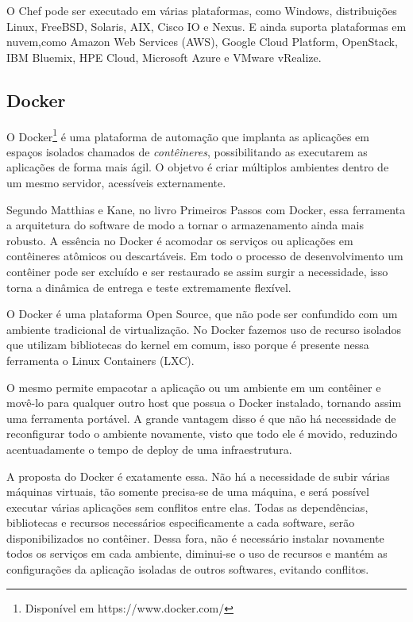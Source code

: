 O Chef pode ser executado em várias plataformas, como Windows, distribuições Linux, FreeBSD, Solaris, AIX, Cisco IO e Nexus. E ainda suporta plataformas em nuvem,como Amazon Web Services (AWS), Google Cloud Platform, OpenStack, IBM Bluemix, HPE Cloud, Microsoft Azure e VMware vRealize.

\subsection{Docker}

O Docker\footnote{Disponível em https://www.docker.com/} é uma plataforma de automação que implanta as aplicações em espaços isolados chamados de \textit{contêineres}, possibilitando as executarem as aplicações de forma mais ágil. O objetvo é criar múltiplos ambientes dentro de um mesmo servidor, acessíveis externamente.

Segundo Matthias e Kane, no livro Primeiros Passos com Docker, essa ferramenta a arquitetura do software de modo a tornar o armazenamento ainda mais robusto. A essência no Docker é acomodar os serviços ou aplicações em contêineres atômicos ou descartáveis. Em todo o processo de desenvolvimento um contêiner pode ser excluído e ser restaurado se assim surgir a necessidade, isso torna a dinâmica de entrega e teste extremamente flexível.\cite{mattiaskane}

O Docker é uma plataforma Open Source, que não pode ser confundido com um ambiente tradicional de virtualização. No Docker fazemos uso de recurso isolados que utilizam bibliotecas do kernel em comum, isso porque é presente nessa ferramenta o Linux Containers (LXC).

O mesmo permite empacotar a aplicação ou um ambiente em um contêiner e movê-lo para qualquer outro host que possua o Docker instalado, tornando assim uma ferramenta portável. A grande vantagem disso é que não há necessidade de reconfigurar todo o ambiente novamente, visto que todo ele é movido, reduzindo acentuadamente o tempo de deploy de uma infraestrutura.


A proposta do Docker é exatamente essa. Não há a necessidade de subir várias máquinas virtuais, tão somente precisa-se de uma máquina, e será possível executar várias aplicações sem conflitos entre elas. Todas as dependências, bibliotecas e recursos necessários especificamente a cada software, serão disponibilizados no contêiner. Dessa fora, não é necessário instalar novamente todos os serviços em cada ambiente, diminui-se o uso de recursos e mantém as configurações da aplicação isoladas de outros softwares, evitando conflitos. \cite{scampini}

